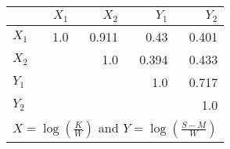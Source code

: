 \begin{tabular}{lrrrr}
\toprule
{} &  $X_1$ &  $X_2$ &  $Y_1$ &  $Y_2$ \\
\midrule
$X_1$ &    1.0 &  0.911 &   0.43 &  0.401 \\
$X_2$ &    &    1.0 &  0.394 &  0.433 \\
$Y_1$ &    &         &    1.0 &  0.717 \\
$Y_2$ &    &        &        &    1.0 \\
\bottomrule
\multicolumn{5}{l}{{\scriptsize $X = \log\left(\frac{K}{W}\right)$ and $Y=\log\left(\frac{S-M}{W}\right)$}}
\end{tabular}
